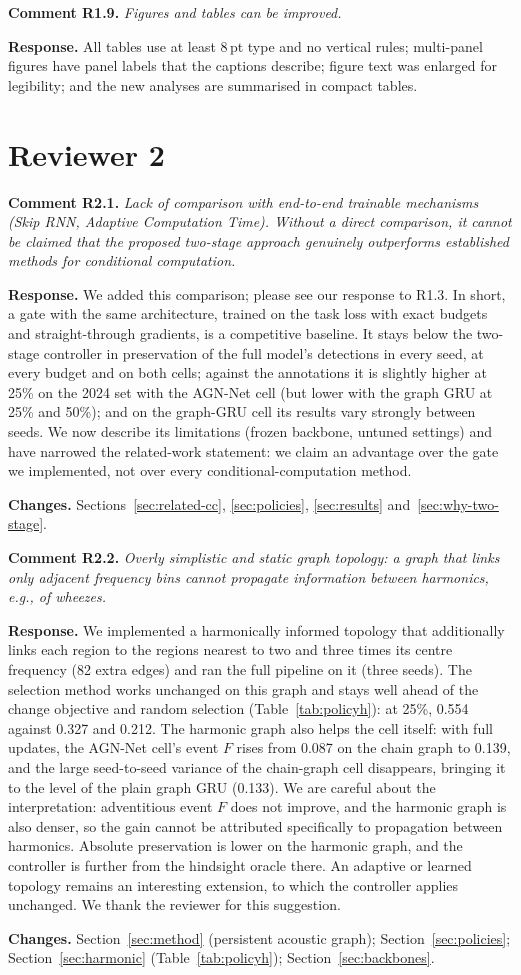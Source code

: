 \documentclass[11pt]{article}
\newcommand{\rc}[2]{\par\medskip\noindent\colorbox{black!6}{\parbox{\dimexpr\linewidth-2\fboxsep}{\textbf{Comment #1.} \itshape #2}}\par}
\newcommand{\resp}{\par\noindent\textbf{Response.} }
\newcommand{\chg}{\par\noindent\textbf{Changes.} }
\begin{document}
\rc{R1.9}{Figures and tables can be improved.}
\resp All tables use at least 8\,pt type and no vertical rules; multi-panel figures have panel labels that the captions describe; figure text was enlarged for legibility; and the new analyses are summarised in compact tables.

\section*{Reviewer 2}

\rc{R2.1}{Lack of comparison with end-to-end trainable mechanisms (Skip RNN, Adaptive Computation Time). Without a direct comparison, it cannot be claimed that the proposed two-stage approach genuinely outperforms established methods for conditional computation.}
\resp We added this comparison; please see our response to R1.3. In short, a gate with the same architecture, trained on the task loss with exact budgets and straight-through gradients, is a competitive baseline. It stays below the two-stage controller in preservation of the full model's detections in every seed, at every budget and on both cells; against the annotations it is slightly higher at 25\% on the 2024 set with the AGN-Net cell (but lower with the graph GRU at 25\% and 50\%); and on the graph-GRU cell its results vary strongly between seeds. We now describe its limitations (frozen backbone, untuned settings) and have narrowed the related-work statement: we claim an advantage over the gate we implemented, not over every conditional-computation method.
\chg Sections~\ref{sec:related-cc}, \ref{sec:policies}, \ref{sec:results} and~\ref{sec:why-two-stage}.

\rc{R2.2}{Overly simplistic and static graph topology: a graph that links only adjacent frequency bins cannot propagate information between harmonics, e.g., of wheezes.}
\resp We implemented a harmonically informed topology that additionally links each region to the regions nearest to two and three times its centre frequency (82 extra edges) and ran the full pipeline on it (three seeds). The selection method works unchanged on this graph and stays well ahead of the change objective and random selection (Table~\ref{tab:policyh}): at 25\%, 0.554 against 0.327 and 0.212. The harmonic graph also helps the cell itself: with full updates, the AGN-Net cell's event $F$ rises from 0.087 on the chain graph to 0.139, and the large seed-to-seed variance of the chain-graph cell disappears, bringing it to the level of the plain graph GRU (0.133). We are careful about the interpretation: adventitious event $F$ does not improve, and the harmonic graph is also denser, so the gain cannot be attributed specifically to propagation between harmonics. Absolute preservation is lower on the harmonic graph, and the controller is further from the hindsight oracle there. An adaptive or learned topology remains an interesting extension, to which the controller applies unchanged. We thank the reviewer for this suggestion.
\chg Section~\ref{sec:method} (persistent acoustic graph); Section~\ref{sec:policies}; Section~\ref{sec:harmonic} (Table~\ref{tab:policyh}); Section~\ref{sec:backbones}.
\end{document}
